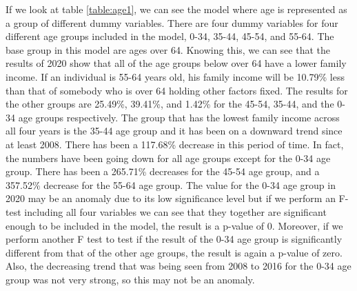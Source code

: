 \documentclass[12pt]{article}
\begin{document}
\begin{spacing}{1.5}

If we look at table \ref{table:age1}, we can see the model where age is represented as a group of different dummy variables. There are four dummy variables for four different age groups included in the model, 0-34, 35-44, 45-54, and 55-64. The base group in this model are ages over 64. Knowing this, we can see that the results of 2020 show that all of the age groups below over 64 have a lower family income. If an individual is 55-64 years old, his family income will be 10.79\% less than that of somebody who is over 64 holding other factors fixed. The results for the other groups are 25.49\%, 39.41\%, and 1.42\% for the 45-54, 35-44, and the 0-34 age groups respectively. The group that has the lowest family income across all four years is the 35-44 age group and it has been on a downward trend since at least 2008. There has been a 117.68\% decrease in this period of time. In fact, the numbers have been going down for all age groups except for the 0-34 age group. There has been a 265.71\% decreases for the 45-54 age group, and a 357.52\% decrease for the 55-64 age group. The value for the 0-34 age group in 2020 may be an anomaly due to its low significance level but if we perform an F-test including all four variables we can see that they together are significant enough to be included in the model, the result is a p-value of 0. Moreover, if we perform another F test to test if the result of the 0-34 age group is significantly different from that of the other age groups, the result is again a p-value of zero. Also, the decreasing trend that was being seen from 2008 to 2016 for the 0-34 age group was not very strong, so this may not be an anomaly.


\end{spacing}
\end{document}
